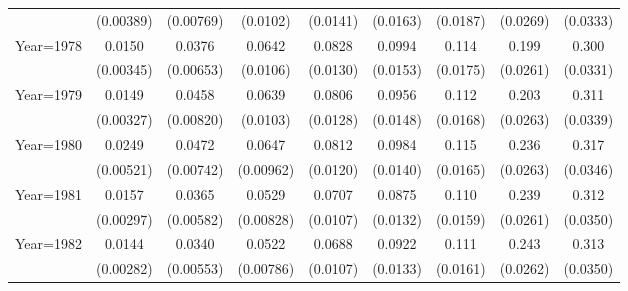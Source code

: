 \begin{table}[htbp]
\begin{tabular}{l*{8}{c}}
                    &   (0.00389)         &   (0.00769)         &    (0.0102)         &    (0.0141)         &    (0.0163)         &    (0.0187)         &    (0.0269)         &    (0.0333)         \\
[1em]
Year=1978           &      0.0150\sym{***}&      0.0376\sym{***}&      0.0642\sym{***}&      0.0828\sym{***}&      0.0994\sym{***}&       0.114\sym{***}&       0.199\sym{***}&       0.300\sym{***}\\
                    &   (0.00345)         &   (0.00653)         &    (0.0106)         &    (0.0130)         &    (0.0153)         &    (0.0175)         &    (0.0261)         &    (0.0331)         \\
[1em]
Year=1979           &      0.0149\sym{***}&      0.0458\sym{***}&      0.0639\sym{***}&      0.0806\sym{***}&      0.0956\sym{***}&       0.112\sym{***}&       0.203\sym{***}&       0.311\sym{***}\\
                    &   (0.00327)         &   (0.00820)         &    (0.0103)         &    (0.0128)         &    (0.0148)         &    (0.0168)         &    (0.0263)         &    (0.0339)         \\
[1em]
Year=1980           &      0.0249\sym{***}&      0.0472\sym{***}&      0.0647\sym{***}&      0.0812\sym{***}&      0.0984\sym{***}&       0.115\sym{***}&       0.236\sym{***}&       0.317\sym{***}\\
                    &   (0.00521)         &   (0.00742)         &   (0.00962)         &    (0.0120)         &    (0.0140)         &    (0.0165)         &    (0.0263)         &    (0.0346)         \\
[1em]
Year=1981           &      0.0157\sym{***}&      0.0365\sym{***}&      0.0529\sym{***}&      0.0707\sym{***}&      0.0875\sym{***}&       0.110\sym{***}&       0.239\sym{***}&       0.312\sym{***}\\
                    &   (0.00297)         &   (0.00582)         &   (0.00828)         &    (0.0107)         &    (0.0132)         &    (0.0159)         &    (0.0261)         &    (0.0350)         \\
[1em]
Year=1982           &      0.0144\sym{***}&      0.0340\sym{***}&      0.0522\sym{***}&      0.0688\sym{***}&      0.0922\sym{***}&       0.111\sym{***}&       0.243\sym{***}&       0.313\sym{***}\\
                    &   (0.00282)         &   (0.00553)         &   (0.00786)         &    (0.0107)         &    (0.0133)         &    (0.0161)         &    (0.0262)         &    (0.0350)         \\

\end{tabular}
\end{table}
